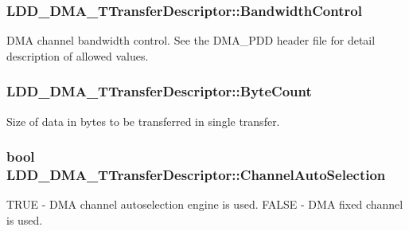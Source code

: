 \subsubsection[{Bandwidth\+Control}]{ L\+D\+D\+\_\+\+D\+M\+A\+\_\+\+T\+Transfer\+Descriptor\+::\+Bandwidth\+Control}\label{struct_l_d_d___d_m_a___t_transfer_descriptor_a163633695c0c3e1a057dffae0e722d16}
D\+M\+A channel bandwidth control. See the D\+M\+A\+\_\+\+P\+D\+D header file for detail description of allowed values. \hypertarget{struct_l_d_d___d_m_a___t_transfer_descriptor_aa02f90cb635b64ab6217e714bcdb1462}{}
\subsubsection[{Byte\+Count}]{ L\+D\+D\+\_\+\+D\+M\+A\+\_\+\+T\+Transfer\+Descriptor\+::\+Byte\+Count}\label{struct_l_d_d___d_m_a___t_transfer_descriptor_aa02f90cb635b64ab6217e714bcdb1462}
Size of data in bytes to be transferred in single transfer. \hypertarget{struct_l_d_d___d_m_a___t_transfer_descriptor_aae81aa421cebab862ae4b8ca9d384318}{}
\subsubsection[{Channel\+Auto\+Selection}]{\setlength{\rightskip}{0pt plus 5cm}bool L\+D\+D\+\_\+\+D\+M\+A\+\_\+\+T\+Transfer\+Descriptor\+::\+Channel\+Auto\+Selection}\label{struct_l_d_d___d_m_a___t_transfer_descriptor_aae81aa421cebab862ae4b8ca9d384318}
T\+R\+U\+E -\/ D\+M\+A channel autoselection engine is used. F\+A\+L\+S\+E -\/ D\+M\+A fixed channel is used. \hypertarget{struct_l_d_d___d_m_a___t_transfer_descriptor_acf5f8fe95f319b19a591880ed8a7a3c0}{}
